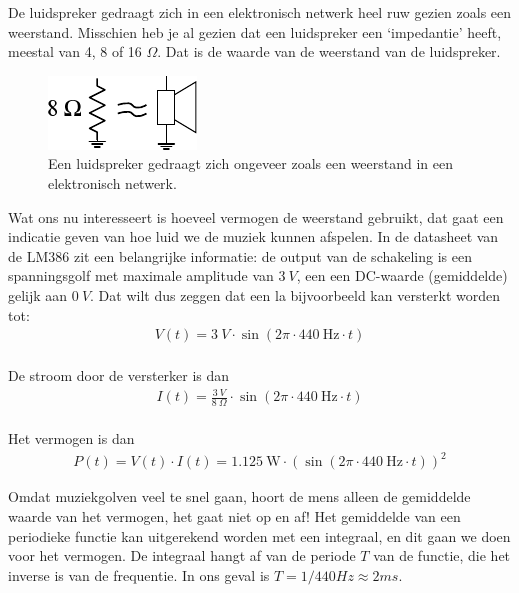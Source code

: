 \documentclass{article}
\begin{document}
			De luidspreker gedraagt zich in een elektronisch netwerk heel ruw gezien zoals een weerstand. Misschien heb je al gezien dat een luidspreker een `impedantie' heeft, meestal van 4, 8 of 16 $\Omega$. Dat is de waarde van de weerstand van de luidspreker.

			\begin{figure}[htbp]
				\centering
				\includegraphics[scale=1.5]{luidspreker}
				\caption{Een luidspreker gedraagt zich ongeveer zoals een weerstand in een elektronisch netwerk.}
				\label{fig:luidspreker}
			\end{figure}

			Wat ons nu interesseert is hoeveel vermogen de weerstand gebruikt, dat gaat een indicatie geven van hoe luid we de muziek kunnen afspelen.
			In de datasheet van de LM386 zit  een belangrijke informatie: de output van de schakeling is een spanningsgolf met maximale amplitude van $3~V$, een een DC-waarde (gemiddelde) gelijk aan $0~V$.
			Dat wilt dus zeggen dat een la bijvoorbeeld kan versterkt worden tot:
			\begin{align}
				V(t) = 3~V \cdot \sin (2\pi \cdot 440~\text{Hz} \cdot t) \\
			\end{align}

			De stroom door de versterker is dan 
				\begin{align}
				I(t) = \frac{3~V}{8~\Omega} \cdot \sin (2\pi \cdot 440~\text{Hz} \cdot t) \\
			\end{align}

			Het vermogen is dan
			\begin{align}
				P(t) = V(t) \cdot I(t) = 1.125~\text{W} \cdot \left( \sin \left(2\pi \cdot 440~\text{Hz} \cdot t\right) \right)^2
			\end{align}

			Omdat muziekgolven veel te snel gaan, hoort de mens alleen de gemiddelde waarde van het vermogen, het gaat niet op en af! 
			Het gemiddelde van een periodieke functie kan uitgerekend worden met een integraal, en dit gaan we doen voor het vermogen. 
			De integraal hangt af van de periode $T$ van de functie, die het inverse is van de frequentie. In ons geval is $T = 1/440Hz \approx 2 ms$.
\end{document}
